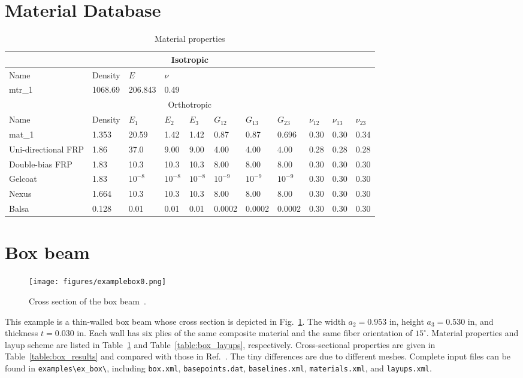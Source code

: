 \documentclass{book}
\begin{document}
\section{Material Database}

\begin{table}[h]
  \centering
  \caption{Material properties}
  \begin{tabular}{lllllllllll}
    \toprule
    \multicolumn{11}{c}{Isotropic} \\
    \midrule
    Name & Density & $E$ & $\nu$ & & & & & & & \\
    \midrule
    mtr\_1 & 1068.69 & 206.843 & 0.49 & & & & & & & \\
    \midrule
    \multicolumn{11}{c}{Orthotropic} \\
    \midrule
    Name & Density & $E_1$ & $E_2$ & $E_3$ & $G_{12}$ & $G_{13}$ & $G_{23}$ & $\nu_{12}$ & $\nu_{13}$ & $\nu_{23}$ \\
    \midrule
    mat\_1 & 1.353 & 20.59 & 1.42 & 1.42 & 0.87 & 0.87 & 0.696 & 0.30 & 0.30 & 0.34 \\
    Uni-directional FRP & 1.86 & 37.0 & 9.00 & 9.00 & 4.00 & 4.00 & 4.00 & 0.28 & 0.28 & 0.28 \\
    Double-bias FRP & 1.83 & 10.3 & 10.3 & 10.3 & 8.00 & 8.00 & 8.00 & 0.30 & 0.30 & 0.30 \\
    Gelcoat & 1.83 & $10^{-8}$ & $10^{-8}$ & $10^{-8}$ & $10^{-9}$ & $10^{-9}$ & $10^{-9}$ & 0.30 & 0.30 & 0.30 \\
    Nexus & 1.664 & 10.3 & 10.3 & 10.3 & 8.00 & 8.00 & 8.00 & 0.30 & 0.30 & 0.30 \\
    Balsa & 0.128 & 0.01 & 0.01 & 0.01 & 0.0002 & 0.0002 & 0.0002 & 0.30 & 0.30 & 0.30 \\
    \bottomrule
  \end{tabular}
  \label{table:materials}
\end{table}


\newpage
\section{Box beam}
\label{eg:box}

\begin{figure}[h]
  \centerline{\texttt{[image: figures/examplebox0.png]}}
  \caption{Cross section of the box beam~\cite{yu2012}.}
  \label{fig:box_draw}
\end{figure}

This example is a thin-walled box beam whose cross section is depicted 
in Fig.~\ref{fig:box_draw}. The width $a_2=0.953$ in, height $a_3=0.530$ 
in, and thickness $t=0.030$ in. Each wall has six plies of the same 
composite material and the same fiber orientation of $15^\circ$. Material 
properties and layup scheme are listed in Table~\ref{table:materials} and 
Table~\ref{table:box_layups}, respectively. Cross-sectional properties are given in 
Table~\ref{table:box_results} and compared with those in Ref.~. The tiny 
differences are due to different meshes. Complete input files can be 
found in \verb|examples\ex_box\|, including \verb|box.xml|, 
\verb|basepoints.dat|, \verb|baselines.xml|, \verb|materials.xml|, and 
\verb|layups.xml|.
\end{document}
